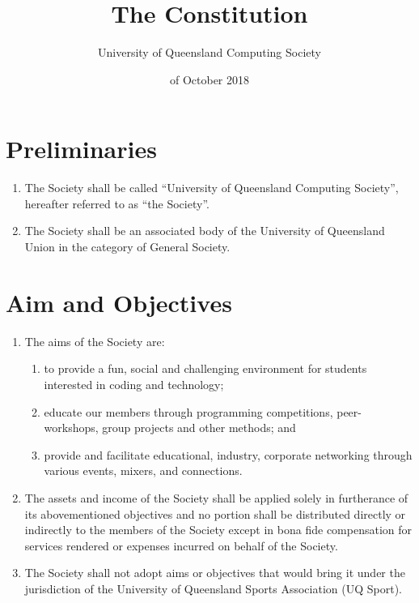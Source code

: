 \documentclass[a4paper]{article}
\begin{document}
\title{The Constitution}
\author{University of Queensland Computing Society}
\date{ of October 2018}
\maketitle
\def\contentsname{\empty}
\vspace{-2\baselineskip}
\tableofcontents
\newpage

\section{Preliminaries}
\begin{enumerate}
\item The Society shall be called ``University of Queensland Computing Society'', hereafter referred to as ``the Society''.
\item The Society shall be an associated body of the University of Queensland Union in the category of General Society.
\end{enumerate}

\section{Aim and Objectives}
\begin{enumerate}
\item The aims of the Society are:
	\begin{enumerate}
	\item to provide a fun, social and challenging environment for students interested in coding and technology;
	\item educate our members through programming competitions, peer-workshops, group projects and other methods; and
	\item provide and facilitate educational, industry, corporate networking through various events, mixers, and connections.
	\end{enumerate}
\item The assets and income of the Society shall be applied solely in furtherance of its above\textendash mentioned objectives and no portion shall be distributed directly or indirectly to the members of the Society except in bona fide compensation for services rendered or expenses incurred on behalf of the Society.
\item The Society shall not adopt aims or objectives that would bring it under the jurisdiction of the University of Queensland Sports Association (UQ Sport).
\end{enumerate}
\end{document}
